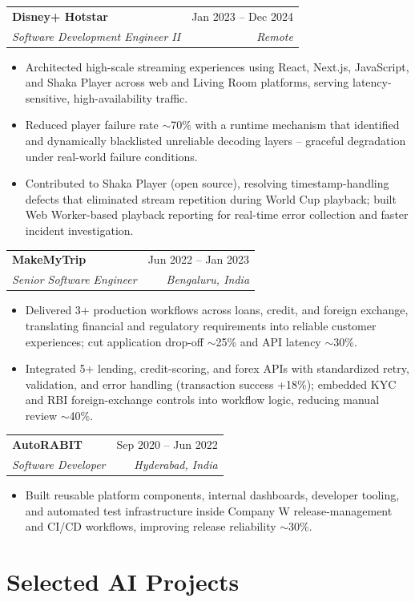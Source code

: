 \documentclass[10.5pt,letterpaper]{article}
\makeatletter
\newcommand{\resumeItem}[1]{\item\small{#1}}
\newcommand{\resumeSubheading}[4]{
  \vspace{4pt}\noindent
  \begin{tabular*}{\textwidth}{l@{\extracolsep{\fill}}r}
    \textbf{#1} & #2 \\
    \textit{\small #3} & \textit{\small #4} \\
  \end{tabular*}\vspace{-2pt}
}
\makeatother
\begin{document}
\resumeSubheading{Disney+ Hotstar}{Jan 2023 -- Dec 2024}{Software Development Engineer II}{Remote}
\begin{itemize}
    \resumeItem{Architected high-scale streaming experiences using React, Next.js, JavaScript, and Shaka Player across web and Living Room platforms, serving latency-sensitive, high-availability traffic.}
    \resumeItem{Reduced player failure rate $\sim$70\% with a runtime mechanism that identified and dynamically blacklisted unreliable decoding layers -- graceful degradation under real-world failure conditions.}
    \resumeItem{Contributed to Shaka Player (open source), resolving timestamp-handling defects that eliminated stream repetition during World Cup playback; built Web Worker-based playback reporting for real-time error collection and faster incident investigation.}
\end{itemize}

\resumeSubheading{MakeMyTrip}{Jun 2022 -- Jan 2023}{Senior Software Engineer}{Bengaluru, India}
\begin{itemize}
    \resumeItem{Delivered 3+ production workflows across loans, credit, and foreign exchange, translating financial and regulatory requirements into reliable customer experiences; cut application drop-off $\sim$25\% and API latency $\sim$30\%.}
    \resumeItem{Integrated 5+ lending, credit-scoring, and forex APIs with standardized retry, validation, and error handling (transaction success +18\%); embedded KYC and RBI foreign-exchange controls into workflow logic, reducing manual review $\sim$40\%.}
\end{itemize}

\resumeSubheading{AutoRABIT}{Sep 2020 -- Jun 2022}{Software Developer}{Hyderabad, India}
\begin{itemize}
    \resumeItem{Built reusable platform components, internal dashboards, developer tooling, and automated test infrastructure inside Company W release-management and CI/CD workflows, improving release reliability $\sim$30\%.}
\end{itemize}

\section*{Selected AI Projects}
\end{document}
